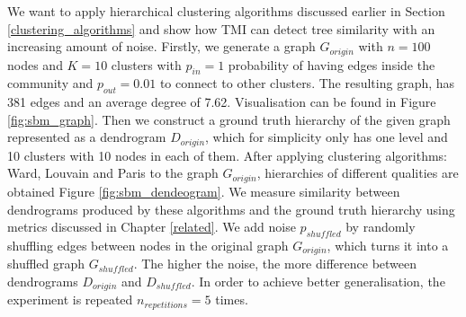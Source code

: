 We want to apply hierarchical clustering algorithms discussed earlier in Section \ref{clustering_algorithms} and show how TMI can detect tree similarity with an increasing amount of noise. Firstly, we generate a graph $G_{origin}$ with $n=100$ nodes and $K=10$ clusters with $p_{in}=1$ probability of having edges inside the community and $p_{out}=0.01$ to connect to other clusters. The resulting graph, has 381 edges and an average degree of 7.62. Visualisation can be found in Figure \ref{fig:sbm_graph}. Then we construct a ground truth hierarchy of the given graph represented as a dendrogram $D_{origin}$, which for simplicity only has one level and 10 clusters with 10 nodes in each of them. After applying clustering algorithms: Ward, Louvain and Paris to the graph $G_{origin}$, hierarchies of different qualities are obtained Figure \ref{fig:sbm_dendeogram}. We measure similarity between dendrograms produced by these algorithms and the ground truth hierarchy using metrics discussed in Chapter \ref{related}. We add noise $p_{shuffled}$ by randomly shuffling edges between nodes in the original graph $G_{origin}$, which turns it into a shuffled graph $G_{shuffled}$. The higher the noise, the more difference between dendrograms $D_{origin}$ and $D_{shuffled}$. In order to achieve better generalisation, the experiment is repeated $n_{repetitions}=5$ times. 

